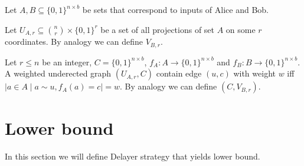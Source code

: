 Let $A, B \subseteq \{0, 1\}^{n \times b}$ be sets that correspond to inputs of Alice and Bob.

Let $U_{A, r} \subseteq \binom{n}{r} \times \{0, 1\}^r$ be a set of all projections of set $A$ on some
$r$ coordinates. By analogy we can define $V_{B, r}$.

\begin{definition}
\label{def:graphs}
    Let $r \le n$ be an integer, $C = \{0, 1\}^{n \times b}$, $f_A: A \to \{0, 1\}^{n \times b}$ and
    $f_B: B \to \{0, 1\}^{n \times b}$. A weighted underected graph $(U_{A, r}, C)$ contain edge $(u, c)$
    with weight $w$ iff $|{a \in A \mid a \sim u, f_A(a) = c}| = w$. By analogy we can define
    $(C, V_{B, r})$. 
\end{definition}

\section{Lower bound}

In this section we will define Delayer strategy that yields lower bound.

